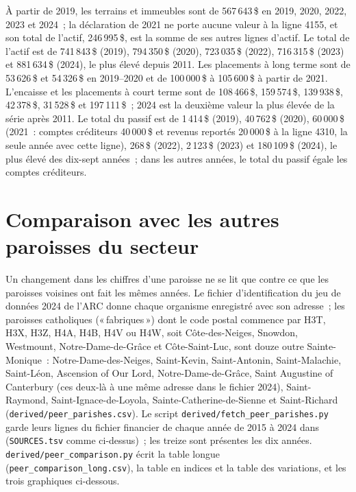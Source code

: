 \documentclass[11pt,letterpaper]{article}
\newcommand{\D}[1]{#1\,\$}
\begin{document}
À partir de 2019, les terrains et immeubles sont de \D{567\,643} en 2019, 2020, 2022, 2023 et 2024~; la déclaration de 2021 ne porte aucune valeur à la ligne 4155, et son total de l'actif, \D{246\,995}, est la somme de ses autres lignes d'actif. Le total de l'actif est de \D{741\,843} (2019), \D{794\,350} (2020), \D{723\,035} (2022), \D{716\,315} (2023) et \D{881\,634} (2024), le plus élevé depuis 2011. Les placements à long terme sont de \D{53\,626} et \D{54\,326} en 2019--2020 et de \D{100\,000} à \D{105\,600} à partir de 2021. L'encaisse et les placements à court terme sont de \D{108\,466}, \D{159\,574}, \D{139\,938}, \D{42\,378}, \D{31\,528} et \D{197\,111}~; 2024 est la deuxième valeur la plus élevée de la série après 2011. Le total du passif est de \D{1\,414} (2019), \D{40\,762} (2020), \D{60\,000} (2021~: comptes créditeurs \D{40\,000} et revenus reportés \D{20\,000} à la ligne 4310, la seule année avec cette ligne), \D{268} (2022), \D{2\,123} (2023) et \D{180\,109} (2024), le plus élevé des dix-sept années~; dans les autres années, le total du passif égale les comptes créditeurs.

\section{Comparaison avec les autres paroisses du secteur}\label{sec:peers}

Un changement dans les chiffres d'une paroisse ne se lit que contre ce que les paroisses voisines ont fait les mêmes années. Le fichier d'identification du jeu de données 2024 de l'ARC donne chaque organisme enregistré avec son adresse~; les paroisses catholiques («\,fabriques\,») dont le code postal commence par H3T, H3X, H3Z, H4A, H4B, H4V ou H4W, soit Côte-des-Neiges, Snowdon, Westmount, Notre-Dame-de-Grâce et Côte-Saint-Luc, sont douze outre Sainte-Monique~: Notre-Dame-des-Neiges, Saint-Kevin, Saint-Antonin, Saint-Malachie, Saint-Léon, Ascension of Our Lord, Notre-Dame-de-Grâce, Saint Augustine of Canterbury (ces deux-là à une même adresse dans le fichier 2024), Saint-Raymond, Saint-Ignace-de-Loyola, Sainte-Catherine-de-Sienne et Saint-Richard (\texttt{derived/peer\_parishes.csv}). Le script \texttt{derived/fetch\_peer\_parishes.py} garde leurs lignes du fichier financier de chaque année de 2015 à 2024 dans  (\texttt{SOURCES.tsv} comme ci-dessus)~; les treize sont présentes les dix années. \texttt{derived/peer\_comparison.py} écrit la table longue (\texttt{peer\_comparison\_long.csv}), la table en indices et la table des variations, et les trois graphiques ci-dessous.
\end{document}
